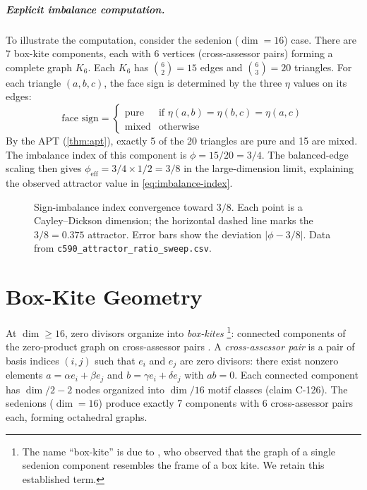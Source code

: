 \documentclass[12pt,openany]{report}
\theoremstyle{definition}
\theoremstyle{plain}
\theoremstyle{remark}
\begin{document}
\paragraph{Explicit imbalance computation.}
To illustrate the computation, consider the sedenion ($\dim = 16$) case.
There are 7 box-kite components, each with 6 vertices (cross-assessor
pairs) forming a complete graph $K_6$.  Each $K_6$ has
$\binom{6}{2} = 15$ edges and $\binom{6}{3} = 20$ triangles.  For each
triangle $(a,b,c)$, the face sign is determined by the three $\eta$
values on its edges:
\begin{equation}
  \text{face sign} =
  \begin{cases}
    \text{pure} & \text{if } \eta(a,b) = \eta(b,c) = \eta(a,c) \\
    \text{mixed} & \text{otherwise}
  \end{cases}
\end{equation}
By the APT (\cref{thm:apt}), exactly 5 of the 20 triangles are pure and
15 are mixed.  The imbalance index of this component is
$\phi = 15/20 = 3/4$.  The balanced-edge scaling then gives
$\phi_{\text{eff}} = 3/4 \times 1/2 = 3/8$ in the large-dimension
limit, explaining the observed attractor value in
\cref{eq:imbalance-index}.

\begin{figure}[htbp]
\centering

\caption{Sign-imbalance index convergence toward $3/8$.  Each point is a
Cayley--Dickson dimension; the horizontal dashed line marks the
$3/8 = 0.375$ attractor.  Error bars show the deviation
$|\phi - 3/8|$.  Data from \texttt{c590\_attractor\_ratio\_sweep.csv}.}
\label{fig:imbalance-index}
\end{figure}


\chapter{Box-Kite Geometry}
\label{ch:boxkite}

At $\dim \geq 16$, zero divisors organize into \emph{box-kites}%
\footnote{The name ``box-kite'' is due to \citet{deMarrais2000BoxKites},
who observed that the graph of a single sedenion component resembles the
frame of a box kite.  We retain this established term.}:
connected components of the zero-product graph on cross-assessor pairs
\cite{deMarrais2000BoxKites,deMarrais2004BoxKitesIII}.
A \emph{cross-assessor pair} is a pair of basis indices $(i,j)$ such
that $e_i$ and $e_j$ are zero divisors: there exist nonzero elements
$a = \alpha e_i + \beta e_j$ and $b = \gamma e_i + \delta e_j$ with
$ab = 0$.  Each connected component has $\dim/2 - 2$ nodes organized
into $\dim/16$ motif classes (claim C-126).  The sedenions ($\dim = 16$)
produce exactly 7 components with 6 cross-assessor pairs each, forming
octahedral graphs.
\end{document}
